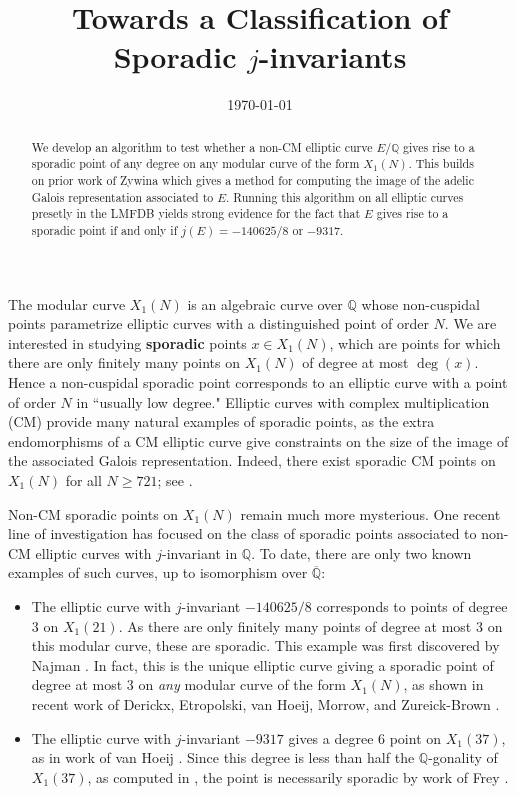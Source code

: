 \documentclass[11pt,reqno]{amsart}
\title{Towards a Classification of Sporadic $j$-invariants}
\date{\today}
\theoremstyle{plain}
\theoremstyle{definition}
\newcommand{\Q}{\mathbb{Q}}
\begin{document}
\begin{abstract}
We develop an algorithm to test whether a non-CM elliptic curve $E/\Q$ gives rise to a sporadic point of any degree on any modular curve of the form $X_1(N)$. This builds on prior work of Zywina which gives a method for computing the image of the adelic Galois representation associated to $E$. Running this algorithm on all elliptic curves presetly in the LMFDB yields strong evidence for the fact that $E$ gives rise to a sporadic point if and only if $j(E)=-140625/8$ or $-9317$.
    \end{abstract}
\maketitle


The modular curve $X_1(N)$ is an algebraic curve over $\Q$ whose non-cuspidal points parametrize elliptic curves with a distinguished point of order $N$. We are interested in studying \textbf{sporadic} points $x \in X_1(N)$, which are points for which there are only finitely many points on $X_1(N)$ of degree at most $\deg(x)$. Hence a non-cuspidal sporadic point corresponds to an elliptic curve with a point of order $N$ in ``usually low degree." Elliptic curves with complex multiplication (CM) provide many natural examples of sporadic points, as the extra endomorphisms of a CM elliptic curve give constraints on the size of the image of the associated Galois representation. Indeed, there exist sporadic CM points on $X_1(N)$ for all $N\geq 721$; see \cite[Theorem 8.2]{CGPS2022}.

Non-CM sporadic points on $X_1(N)$ remain much more mysterious. One recent line of investigation has focused on the class of sporadic points associated to non-CM elliptic curves with $j$-invariant in $\Q$. To date, there are only two known examples of such curves, up to isomorphism over $\overline{\Q}$:
\begin{itemize}
\item The elliptic curve with $j$-invariant $-140625/8$ corresponds to points of degree 3 on $X_1(21)$. As there are only finitely many points of degree at most 3 on this modular curve, these are sporadic. This example was first discovered by Najman \cite{najman16}. In fact, this is the unique elliptic curve giving a sporadic point of degree at most 3 on \emph{any} modular curve of the form $X_1(N)$, as shown in recent work of Derickx, Etropolski, van Hoeij, Morrow, and Zureick-Brown \cite{DEvHMZB2021}.
\item The elliptic curve with $j$-invariant $-9317$ gives a degree 6 point on $X_1(37)$, as in work of van Hoeij \cite{vanHoeij}. Since this degree is less than half the $\Q$-gonality of $X_1(37)$, as computed in \cite{DerickxVanHoeij2014}, the point is necessarily sporadic by work of Frey \cite{frey}.
\end{itemize}
\end{document}
